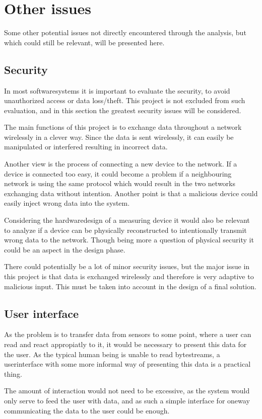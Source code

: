 \section{Other issues}
Some other potential issues not directly encountered through the analysis, but which could still be relevant, will be presented here.

\subsection{Security}
In most softwaresystems it is important to evaluate the security, to avoid unauthorized access or data loss/theft. This project is not excluded from such evaluation, and in this section the greatest security issues will be considered.

The main functions of this project is to exchange data throughout a network wirelessly in a clever way. Since the data is sent wirelessly, it can easily be manipulated or interfered resulting in incorrect data.

Another view is the process of connecting a new device to the network. If a device is connected too easy, it could become a problem if a neighbouring network is using the same protocol which would result in the two networks exchanging data without intention. Another point is that a malicious device could easily inject wrong data into the system.

Considering the hardwaredesign of a measuring device it would also be relevant to analyze if a device can be physically reconstructed to intentionally transmit wrong data to the network. Though being more a question of physical security it could be an aspect in the design phase.

There could potentially be a lot of minor security issues, but the major issue in this project is that data is exchanged wirelessly and therefore is very adaptive to malicious input. This must be taken into account in the design of a final solution.

\subsection{User interface}
As the problem is to transfer data from sensors to some point, where a user can read and react appropiatly to it, it would be necessary to present this data for the user. As the typical human being is unable to read bytestreams, a userinterface with some more informal way of presenting this data is a practical thing.

The amount of interaction would not need to be excessive, as the system would only serve to feed the user with data, and as such a simple interface for oneway communicating the data to the user could be enough.
